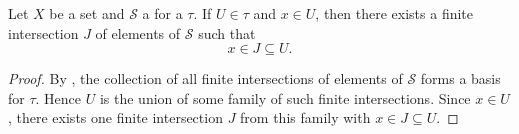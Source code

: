 \begin{lemma} \label{lemma:point_in_open_set_has_finite_subbasis_intersection_neighborhood}
    Let $X$ be a set and $\mathcal{S}$ a  for a  $\tau$. If $U \in \tau$ and $x \in U$, then there exists a finite intersection $J$ of elements of $\mathcal{S}$ such that
    $$x \in J \subseteq U.$$
\end{lemma}

\begin{proof}
    By , the collection of all finite intersections of elements of $\mathcal{S}$ forms a basis for $\tau$. Hence $U$ is the union of some family of such finite intersections. Since $x \in U$, there exists one finite intersection $J$ from this family with $x \in J \subseteq U$.
\end{proof}
